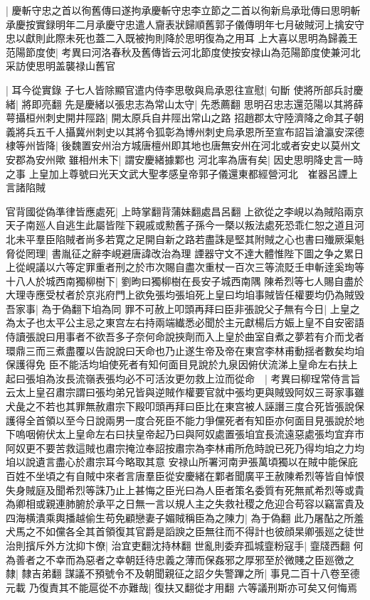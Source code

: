 |{
	慶斬守忠之首以徇舊傳曰遂拘承慶斬守忠李立節之二首以徇新烏承玭傳曰思明斬承慶按實録明年二月承慶守忠遣人齎表狀歸順舊郭子儀傳明年七月破賊河上擒安守忠以獻則此際未死也蓋二入既被拘則降於思明復為之用耳}
上大喜以思明為歸義王范陽節度使|{
	考異曰河洛春秋及舊傳皆云河北節度使按安禄山為范陽節度使兼河北采訪使思明盖襲禄山舊官}


|{
	耳今從實錄}
子七人皆除顯官遣内侍李思敬與烏承恩往宣慰|{
	句斷}
使將所部兵討慶緒|{
	將即亮翻}
先是慶緒以張忠志為常山太守|{
	先悉薦翻}
思明召忠志還范陽以其將薛萼攝桓州刺史開井陘路|{
	開太原兵自井陘出常山之路}
招趙郡太守陸濟降之命其子朝義將兵五千人攝冀州刺史以其將令狐彰為博州刺史烏承恩所至宣布詔旨滄瀛安深德棣等州皆降|{
	後魏置安州治方城唐檀州即其地也唐無安州在河北或者安史以莫州文安郡為安州歟}
雖相州未下|{
	謂安慶緒據鄴也}
河北率為唐有矣|{
	因史思明降史言一時之事}
上皇加上尊號曰光天文武大聖孝感皇帝郭子儀還東都經營河北　崔器呂諲上言諸陷賊

官背國從偽準律皆應處死|{
	上時掌翻背蒲妹翻處昌呂翻}
上欲從之李峴以為賊陷兩京天子南廵人自逃生此屬皆陛下親戚或勲舊子孫今一槩以叛法處死恐乖仁恕之道且河北未平羣臣陷賊者尚多若寛之足開自新之路若盡誅是堅其附賊之心也書曰殱厥渠魁脅從罔理|{
	書胤征之辭李峴避唐諱改治為理}
諲器守文不達大體惟陛下圖之争之累日上從峴議以六等定罪重者刑之於市次賜自盡次重杖一百次三等流貶壬申斬逹奚珣等十八人於城西南獨柳樹下|{
	劉昫曰獨柳樹在長安子城西南隅}
陳希烈等七人賜自盡於大理寺應受杖者於京兆府門上欲免張均張垍死上皇曰均垍事賊皆任權要均仍為賊毁吾家事|{
	為于偽翻下垍為同}
罪不可赦上叩頭再拜曰臣非張說父子無有今日|{
	上皇之為太子也太平公主忌之東宫左右持兩端纎悉必聞於主元獻楊后方娠上皇不自安密語侍讀張說曰用事者不欲吾多子奈何命說挾劑而入上皇於曲室自煮之夢若有介而戈者環鼎三而三煮盡覆以告說說曰天命也乃止遂生帝及帝在東宫李林甫動揺者數矣均垍保護得免}
臣不能活均垍使死者有知何面目見說於九泉因俯伏流涕上皇命左右扶上起曰張垍為汝長流嶺表張均必不可活汝更勿救上泣而從命　|{
	考異曰柳珵常侍言旨云太上皇召肅宗謂曰張均弟兄皆與逆賊作權要官就中張均更與賊毁阿奴三哥家事雖犬彘之不若也其罪無赦肅宗下殿叩頭再拜曰臣比在東宫被人誣譖三度合死皆張說保護得全首領以至今日說兩男一度合死臣不能力爭儻死者有知臣亦何面目見張說於地下嗚咽俯伏太上皇命左右曰扶皇帝起乃曰與阿奴處置張垍宜長流遠惡處張均宜弃市阿奴更不要苦救這賊也肅宗掩泣奉詔按肅宗為李林甫所危時說已死乃得均垍之力均垍以說遺言盡心於肅宗耳今略取其意}
安禄山所署河南尹張萬頃獨以在賊中能保庇百姓不坐頃之有自賊中來者言唐羣臣從安慶緒在鄴者聞廣平王赦陳希烈等皆自悼恨失身賊庭及聞希烈等誅乃止上甚悔之臣光曰為人臣者策名委質有死無貳希烈等或貴為卿相或親連肺腑於承平之日無一言以規人主之失救社稷之危迎合苟容以竊富貴及四海横潰乘輿播越偷生苟免顧戀妻子媚賊稱臣為之陳力|{
	為于偽翻}
此乃屠酟之所羞犬馬之不如儻各全其首領復其官爵是謟諛之臣無往而不得計也彼顔杲卿張廵之徒世治則擯斥外方沈抑卞僚|{
	治宜吏翻沈持林翻}
世亂則委弃孤城韲粉寇手|{
	韲牋西翻}
何為善者之不幸而為惡者之幸朝廷待忠義之薄而保姦邪之厚邪至於微賤之臣廵徼之隸|{
	隸吉弟翻}
謀議不預號令不及朝聞親征之詔夕失警蹕之所|{
	事見二百十八卷至德元載}
乃復責其不能扈從不亦難哉|{
	復扶又翻從才用翻}
六等議刑斯亦可矣又何悔焉

